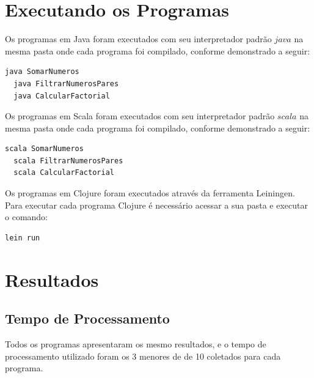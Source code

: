   \section{Executando os Programas}

  Os programas em Java foram executados com seu interpretador padrão $java$ na mesma pasta onde cada programa foi compilado, conforme demonstrado a seguir:

  \begin{lstlisting}[mathescape=false]
  java SomarNumeros
  java FiltrarNumerosPares
  java CalcularFactorial
  \end{lstlisting}

  Os programas em Scala foram executados com seu interpretador padrão $scala$ na mesma pasta onde cada programa foi compilado, conforme demonstrado a seguir:

  \begin{lstlisting}[mathescape=false]
  scala SomarNumeros
  scala FiltrarNumerosPares
  scala CalcularFactorial
  \end{lstlisting}

  Os programas em Clojure foram executados através da ferramenta Leiningen. Para executar cada programa Clojure é necessário acessar a sua pasta e executar o comando:

  \begin{lstlisting}[mathescape=false]
  lein run
  \end{lstlisting}

\section{Resultados}

  \subsection{Tempo de Processamento}

    Todos os programas apresentaram os mesmo resultados, e o tempo de processamento utilizado foram os 3 menores de de 10 coletados para cada programa.

